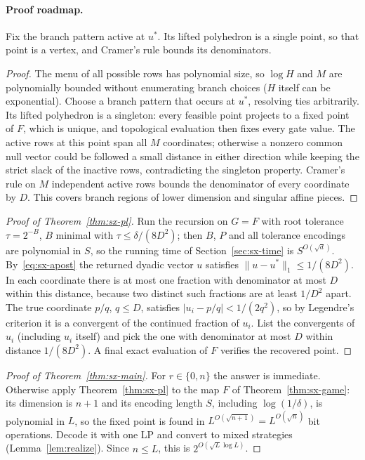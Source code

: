 \paragraph{Proof roadmap.} Fix the branch pattern active at $u^*$. Its lifted polyhedron is a single point,
so that point is a vertex, and Cramer's rule bounds its denominators.

\begin{proof}
The menu of all possible rows has polynomial size, so $\log H$ and $M$ are polynomially bounded without
enumerating branch choices ($H$ itself can be exponential). Choose a branch pattern that occurs at $u^*$, resolving ties arbitrarily. Its
lifted polyhedron is a singleton: every feasible point projects to a fixed point of $F$, which is unique,
and topological evaluation then fixes every gate value. The active rows at this point span all $M$
coordinates; otherwise a nonzero common null vector could be followed a small distance in either
direction while keeping the strict slack of the inactive rows, contradicting the singleton property.
Cramer's rule on $M$ independent active rows bounds the denominator of every coordinate by $D$. This
covers branch regions of lower dimension and singular affine pieces.
\end{proof}

\begin{proof}[Proof of Theorem~\ref{thm:sx-pl}]
Run the recursion on $G=F$ with root tolerance $\tau=2^{-B}$, $B$ minimal with $\tau\le\delta/(8D^2)$;
then $B$, $P$ and all tolerance encodings are polynomial in $S$, so the running time of
Section~\ref{sec:sx-time} is $S^{O(\sqrt d)}$. By~\eqref{eq:sx-apost} the returned dyadic vector $u$
satisfies $\|u-u^*\|_1\le1/(8D^2)$. In each coordinate there is at most one fraction with denominator at
most $D$ within this distance, because two distinct such fractions are at least $1/D^2$ apart. The true
coordinate $p/q$, $q\le D$, satisfies $|u_i-p/q|<1/(2q^2)$, so by Legendre's criterion it is a convergent
of the continued fraction of $u_i$. List the convergents of $u_i$ (including $u_i$ itself) and pick the
one with denominator at most $D$ within distance $1/(8D^2)$. A final exact evaluation of $F$ verifies the
recovered point.
\end{proof}

\begin{proof}[Proof of Theorem~\ref{thm:sx-main}]
For $r\in\{0,n\}$ the answer is immediate. Otherwise apply Theorem~\ref{thm:sx-pl} to the map $F$ of
Theorem~\ref{thm:sx-game}: its dimension is $n+1$ and its encoding length $S$, including
$\log(1/\delta)$, is polynomial in $L$, so the fixed point is found in $L^{O(\sqrt{n+1})}=L^{O(\sqrt n)}$
bit operations. Decode it with one LP and convert to mixed strategies (Lemma~\ref{lem:realize}). Since
$n\le L$, this is $2^{O(\sqrt L\log L)}$.
\end{proof}

